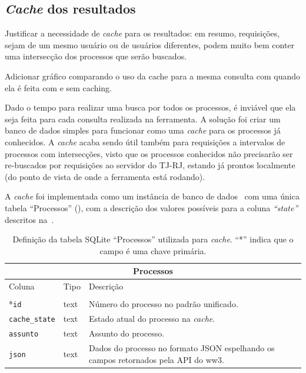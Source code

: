 \subsection{\textit{Cache} dos resultados}

\begin{todolist}
    \item Justificar a necessidade de \textit{cache} para os resultados: em
          resumo, requisições, sejam de um mesmo usuário ou de usuários
          diferentes, podem muito bem conter uma intersecção dos processos que
          serão buscados.
    \item Adicionar gráfico comparando o uso da cache para a mesma consulta com
          quando ela é feita com e sem caching.
\end{todolist}

Dado o tempo para realizar uma busca por todos os processos, é inviável que ela
seja feita para cada consulta realizada na ferramenta. A solução foi criar um
banco de dados simples para funcionar como uma \textit{cache} para os processos
já conhecidos. A \textit{cache} acaba sendo útil também para requisições a
intervalos de processos com intersecções, visto que os processos conhecidos não
precisarão ser re-buscados por requisições ao servidor do TJ-RJ, estando já
prontos localmente (do ponto de vista de onde a ferramenta está rodando).

A \textit{cache} foi implementada como um instância de banco de
dados~\cite{tool:sqlite} com uma única tabela ``Processos''
(), com a descrição dos valores possíveis
para a coluna \textit{``state''} descritos na~.

\begin{table}[htb]
    \centering
    \begin{tabular}{llp{}}
        \toprule
        \multicolumn{3}{c}{Processos} \\
        \midrule
        Coluna & Tipo & Descrição \\
        \midrule \\
        *\texttt{id} & text & Número do processo no padrão unificado. \\
        \texttt{cache\_state} & text & Estado atual do processo na \textit{cache}. \\
        \texttt{assunto} & text & Assunto do processo. \\
        \texttt{json} & text & Dados do processo no formato JSON espelhando os campos retornados pela API do ww3. \\
        \bottomrule
    \end{tabular}
    \caption{%
        Definição da tabela SQLite ``Processos'' utilizada para \textit{cache}.
        ``*'' indica que o campo é uma chave primária.
    }
    \label{tbl:estrutura-tabela-processos}
\end{table}


